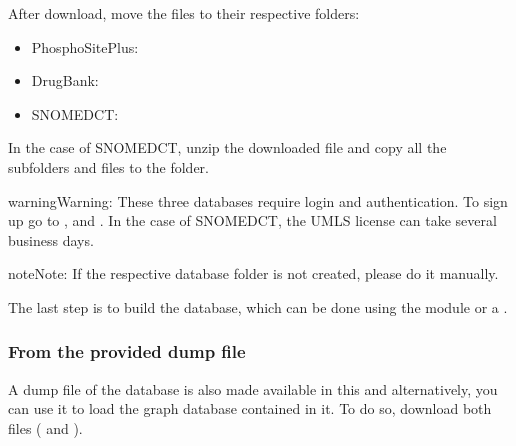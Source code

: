 \documentclass[letterpaper,10pt,english]{sphinxmanual}
\begin{document}
After download, move the files to their respective folders:
\begin{itemize}
\item {} 
PhosphoSitePlus: 

\item {} 
DrugBank: 

\item {} 
SNOMED\sphinxhyphen{}CT: 

\end{itemize}

In the case of SNOMED\sphinxhyphen{}CT, unzip the downloaded file and copy all the subfolders and files to the  folder.

\begin{sphinxadmonition}{warning}{Warning:}
These three databases require login and authentication. To sign up go to ,  and . In the case of SNOMED\sphinxhyphen{}CT, the UMLS license can take several business days.
\end{sphinxadmonition}

\begin{sphinxadmonition}{note}{Note:}
If the respective database folder is not created, please do it manually.
\end{sphinxadmonition}

The last step is to build the database, which can be done using the  module or a .


\subsubsection{From the provided dump file}
\label{\detokenize{intro/getting-started-with-build:from-the-provided-dump-file}}
A dump file of the database is also made available in this  and alternatively, you can use it to load the graph database contained in it. To do so, download both files ( and ).
\end{document}
